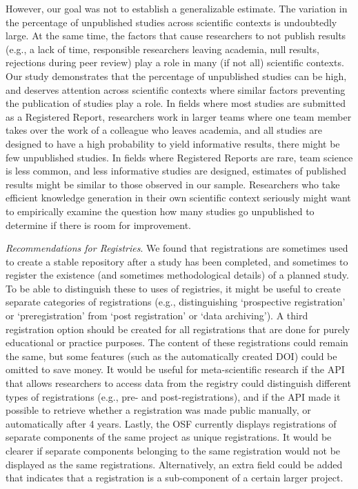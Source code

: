 \documentclass[
  ,jou, a4paper,floatsintext]{apa6}
\begin{document}
However, our goal was not to establish a generalizable estimate. The variation in the percentage of unpublished studies across scientific contexts is undoubtedly large. At the same time, the factors that cause researchers to not publish results (e.g., a lack of time, responsible researchers leaving academia, null results, rejections during peer review) play a role in many (if not all) scientific contexts. Our study demonstrates that the percentage of unpublished studies can be high, and deserves attention across scientific contexts where similar factors preventing the publication of studies play a role. In fields where most studies are submitted as a Registered Report, researchers work in larger teams where one team member takes over the work of a colleague who leaves academia, and all studies are designed to have a high probability to yield informative results, there might be few unpublished studies. In fields where Registered Reports are rare, team science is less common, and less informative studies are designed, estimates of published results might be similar to those observed in our sample. Researchers who take efficient knowledge generation in their own scientific context seriously might want to empirically examine the question how many studies go unpublished to determine if there is room for improvement.

\emph{Recommendations for Registries}. We found that registrations are sometimes used to create a stable repository after a study has been completed, and sometimes to register the existence (and sometimes methodological details) of a planned study. To be able to distinguish these to uses of registries, it might be useful to create separate categories of registrations (e.g., distinguishing `prospective registration' or `preregistration' from `post registration' or `data archiving'). A third registration option should be created for all registrations that are done for purely educational or practice purposes. The content of these registrations could remain the same, but some features (such as the automatically created DOI) could be omitted to save money. It would be useful for meta-scientific research if the API that allows researchers to access data from the registry could distinguish different types of registrations (e.g., pre- and post-registrations), and if the API made it possible to retrieve whether a registration was made public manually, or automatically after 4 years. Lastly, the OSF currently displays registrations of separate components of the same project as unique registrations. It would be clearer if separate components belonging to the same registration would not be displayed as the same registrations. Alternatively, an extra field could be added that indicates that a registration is a sub-component of a certain larger project.
\end{document}
